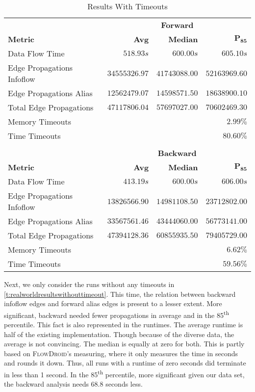\documentclass[../draft.tex]{subfiles}
\begin{document}
    \begin{table}[tbp]
        \centering
        \begin{tabular}{l | r | r | r}
            & \multicolumn{3}{c}{\textbf{Forward}}\\
            \textbf{Metric} & \textbf{Avg} & \textbf{Median} & $\mathbf{P_{85}}$\\
            \hline\hline
            Data Flow Time & $518.93s$ & $600.00s$ & $605.10s$\\
            \hline
            Edge Propagations Infoflow & $34555326.97$ & $41743088.00$ & $52163969.60$\\
            Edge Propagations Alias & $12562479.07$ & $14598571.50$ & $18638900.10$\\
            Total Edge Propagations & $47117806.04$ & $57697027.00$ & $70602469.30$\\
            \hline
            Memory Timeouts & \multicolumn{3}{r}{$2.99\%$}\\
            Time Timeouts & \multicolumn{3}{r}{$80.60\%$}\\
            \multicolumn{4}{c}{}\\
            & \multicolumn{3}{c}{\textbf{Backward}}\\
            \textbf{Metric} & \textbf{Avg} & \textbf{Median} & $\mathbf{P_{85}}$\\
            \hline\hline
            Data Flow Time & $413.19s$ & $600.00s$ & $606.00s$\\
            \hline
            Edge Propagations Infoflow & $13826566.90$ & $14981108.50$ & $23712802.00$\\
            Edge Propagations Alias & $33567561.46$ & $43444060.00$ & $56773141.00$\\
            Total Edge Propagations & $47394128.36$ & $60855935.50$ & $79405729.00$\\
            \hline
            Memory Timeouts & \multicolumn{3}{r}{$6.62\%$}\\
            Time Timeouts & \multicolumn{3}{r}{$59.56\%$}\\
        \end{tabular}
        \caption{Results With Timeouts}
        \label{t:realworldresults}
    \end{table}

    Next, we only consider the runs without any timeouts in \autoref{t:realworldresultswithouttimeout}.
    This time, the relation between backward infoflow edges and forward alias edges is present to a lesser extent.
    More significant, backward needed fewer propagations in average and in the 85\textsuperscript{th} percentile.
    This fact is also represented in the runtimes. 
    The average runtime is half of the existing implementation.
    Though because of the diverse data, the average is not convincing.
    The median is equally at zero for both.
    This is partly based on \textsc{FlowDroid}'s measuring, where it only measures the time in seconds and rounds it down.
    Thus, all runs with a runtime of zero seconds did terminate in less than 1 second.
    In the 85\textsuperscript{th} percentile, more significant given our data set, the backward analysis needs $68.8$ seconds less.
\end{document}
